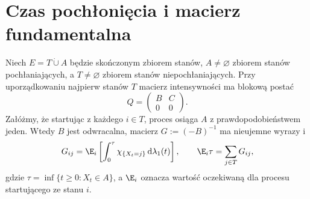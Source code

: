 \section{Czas pochłonięcia i macierz fundamentalna}
\begin{twierdzenie}
\label{thm:ctmc-absorption}
Niech $E=T\mathbin{\dot\cup}A$ będzie skończonym zbiorem stanów,
$A\ne\varnothing$ zbiorem stanów pochłaniających,
a $T\ne\varnothing$ zbiorem stanów niepochłaniających. Przy uporządkowaniu
najpierw stanów $T$ macierz intensywności ma blokową postać
\[
Q=\begin{pmatrix}B&C\\0&0\end{pmatrix}.
\]
Załóżmy, że startując z każdego $i\in T$, proces
osiąga $A$ z prawdopodobieństwem jeden.
Wtedy $B$ jest odwracalna, macierz
$G:=(-B)^{-1}$ ma nieujemne wyrazy i
\[
G_{ij}=\E_i\left[\int_0^\tau\chi_{\{X_t=j\}}\,\mathrm d\lambda_1(t)\right],
\qquad
\E_i\tau=\sum_{j\in T}G_{ij},
\]
gdzie $\tau=\inf\{t\ge0:X_t\in A\}$, a
$\E_i$ oznacza wartość oczekiwaną dla procesu
startującego ze stanu $i$.
\end{twierdzenie}
